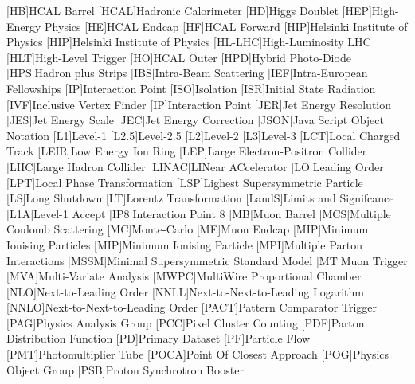 \begin{acronym}
  [HB]{HCAL Barrel}
  [HCAL]{Hadronic Calorimeter}
  [HD]{Higgs Doublet}
  [HEP]{High-Energy Physics}
  [HE]{HCAL Endcap}
  [HF]{HCAL Forward}
  [HIP]{Helsinki Institute of Physics}
  [HIP]{Helsinki Institute of Physics}
  [HL-LHC]{High-Luminosity LHC}
  [HLT]{High-Level Trigger}
  [HO]{HCAL Outer}
  [HPD]{Hybrid Photo-Diode}
  [HPS]{Hadron plus Strips}
  [IBS]{Intra-Beam Scattering}
  [IEF]{Intra-European Fellowships}
  [IP]{Interaction Point}
  [ISO]{Isolation}
  [ISR]{Initial State Radiation}
  [IVF]{Inclusive Vertex Finder}
  [IP]{Interaction Point}
  [JER]{Jet Energy Resolution}
  [JES]{Jet Energy Scale}
  [JEC]{Jet Energy Correction}
  [JSON]{Java Script Object Notation}
  [L1]{Level-1}
  [L2.5]{Level-2.5}
  [L2]{Level-2}
  [L3]{Level-3}
  [LCT]{Local Charged Track}
  [LEIR]{Low Energy Ion Ring}
  [LEP]{Large Electron-Positron Collider}
  [LHC]{Large Hadron Collider}
  [LINAC]{LINear ACcelerator}
  [LO]{Leading Order}
  [LPT]{Local Phase Transformation}
  [LSP]{Lighest Supersymmetric Particle}
  [LS]{Long Shutdown}
  [LT]{Lorentz Transformation}
  [LandS]{Limits and Signifcance}
  [L1A]{Level-1 Accept}
  [IP8]{Interaction Point 8}
  [MB]{Muon Barrel}
  [MCS]{Multiple Coulomb Scattering}
  [MC]{Monte-Carlo}
  [ME]{Muon Endcap}
  [MIP]{Minimum Ionising Particles}
  [MIP]{Minimum Ionising Particle}
  [MPI]{Multiple Parton Interactions}
  [MSSM]{Minimal Supersymmetric Standard Model}
  [MT]{Muon Trigger}
  [MVA]{Multi-Variate Analysis}
  [MWPC]{MultiWire Proportional Chamber}
  [NLO]{Next-to-Leading Order}
  [NNLL]{Next-to-Next-to-Leading Logarithm}
  [NNLO]{Next-to-Next-to-Leading Order}
  [PACT]{Pattern Comparator Trigger}
  [PAG]{Physics Analysis Group}
  [PCC]{Pixel Cluster Counting}
  [PDF]{Parton Distribution Function}
  [PD]{Primary Dataset}
  [PF]{Particle Flow}
  [PMT]{Photomultiplier Tube}
  [POCA]{Point Of Closest Approach}
  [POG]{Physics Object Group}
  [PSB]{Proton Synchrotron Booster}

\end{acronym}
